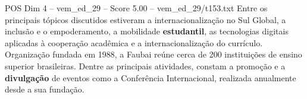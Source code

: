 \begin{textsample}{POS Dim 4 – vem\_ed\_29 – Score 5.00 – vem\_ed\_29/t153.txt}
Entre os principais tópicos discutidos estiveram a internacionalização no Sul Global, a inclusão e o empoderamento, a mobilidade \textbf{estudantil}, as tecnologias digitais aplicadas à cooperação acadêmica e a internacionalização do currículo.
Organização fundada em 1988, a Faubai reúne cerca de 200 instituições de ensino superior brasileiras.
Dentre as principais atividades, constam a promoção e a \textbf{divulgação} de eventos como a Conferência Internacional, realizada anualmente desde a sua fundação.

\end{textsample}
